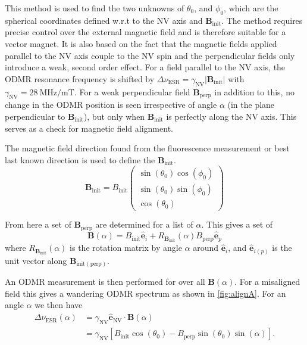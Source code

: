 This method is used to find the two unknowns of $\theta_0$, and $\phi_0$, which are the spherical coordinates defined w.r.t to the \gls{NV} axis and $\mathbf{B}_{\text{init}}$. The method requires precise control over the external magnetic field and is therefore suitable for a vector magnet. It is also based on the fact that the magnetic fields applied parallel to the \gls{NV} axis couple to the \gls{NV} spin and the perpendicular fields only introduce a weak, second order effect. For a field parallel to the \gls{NV} axis, the \gls{ODMR} resonance frequency is shifted by $\Delta\nu_{\text{ESR}} = \gamma_{\text{NV}}\lvert \mathbf{B}_{\text{init}} \rvert$ with $\gamma_{\text{NV}}=\qty{28}{\mega\hertz/\milli\tesla}$. For a weak perpendicular field $\mathbf{B}_{\text{perp}}$ in addition to this, no change in the \gls{ODMR} position is seen irrespective of angle $\alpha$ (in the plane perpendicular to $\mathbf{B}_{\text{init}}$), but only when $\mathbf{B}_{\text{init}}$ is perfectly along the \gls{NV} axis. This serves as a check for magnetic field alignment.

The magnetic field direction found from the fluorescence measurement or best last known direction is used to define the $\mathbf{B}_{\text{init}}$. 
\begin{equation}
\mathbf{B}_{\text{init}} = B_{\text{init}} 
\begin{pmatrix}
\sin(\theta_0) \cos(\phi_0) \\
\sin(\theta_0) \sin(\phi_0) \\
\cos(\theta_0)
\end{pmatrix}
\end{equation}

From here a set of $\mathbf{B}_{\text{perp}}$ are determined for a list of $\alpha$. This gives a set of 
\begin{equation}
    \mathbf{B}(\alpha) = B_{\text{init}} \hat{\mathbf{e}}_i + R_{\mathbf{B}_{\text{init}}}(\alpha) B_{\text{perp}} \hat{\mathbf{e}}_p
\end{equation}
where $R_{\mathbf{B}_{\text{init}}}(\alpha)$ is the rotation matrix by angle $\alpha$ around $\hat{\mathbf{e}}_i$, and $\hat{\mathbf{e}}_{i(p)}$ is the unit vector along $\mathbf{B}_{\text{init}(\text{perp})}$.

An \gls{ODMR} measurement is then performed for over all $\mathbf{B}(\alpha)$. For a misaligned field this gives a wandering \gls{ODMR} spectrum as shown in \cref{fig:alignA}. For an angle $\alpha$ we then have 
\begin{equation}
    \begin{split}
       \Delta\nu_{\text{ESR}}(\alpha) &= \gamma_{\text{NV}} \hat{\mathbf{e}}_{\text{NV}} \cdot \mathbf{B}(\alpha) \\
       &= \gamma_{\text{NV}} \left[ B_{\text{init}} \cos(\theta_0) - B_{\text{perp}} \sin(\theta_0) \sin(\alpha) \right]. 
    \end{split}
\end{equation}

